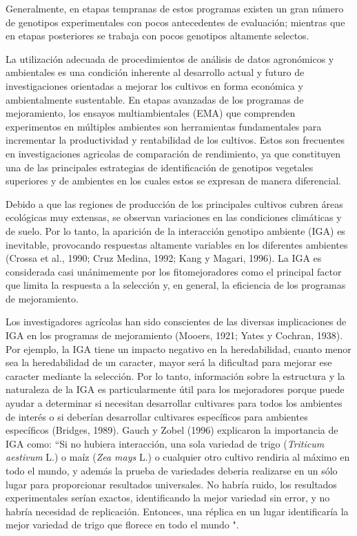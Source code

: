 Generalmente, en etapas tempranas de estos programas existen un gran número de genotipos experimentales con pocos antecedentes de evaluación; mientras que en etapas posteriores  se trabaja con pocos genotipos altamente selectos. 

La utilización adecuada de procedimientos de análisis de datos agronómicos y ambientales es una condición inherente al desarrollo actual y futuro de investigaciones orientadas a mejorar los cultivos en forma económica y ambientalmente sustentable. En etapas avanzadas de los programas de mejoramiento, los ensayos multiambientales (EMA) que comprenden experimentos en múltiples ambientes son herramientas fundamentales para incrementar la productividad y rentabilidad de los cultivos. Estos son frecuentes en investigaciones agricolas de comparación de rendimiento, ya que constituyen una de las principales estrategias de identificación de genotipos vegetales superiores y de ambientes en los cuales estos se expresan de manera diferencial.

Debido a que las regiones de producción de los principales cultivos cubren áreas ecológicas muy extensas, se observan variaciones en las condiciones climáticas y de suelo. Por lo tanto, la aparición de la interacción genotipo ambiente (IGA) es inevitable, provocando respuestas altamente variables en los diferentes ambientes (Crossa et al., 1990; Cruz Medina, 1992; Kang y Magari, 1996). La IGA es considerada casi unánimemente por los fitomejoradores como el principal factor que limita la respuesta a la selección y, en general, la eficiencia de los programas de mejoramiento. 

Los investigadores agrícolas han sido conscientes de las diversas implicaciones de IGA en los programas de mejoramiento (Mooers, 1921; Yates y Cochran, 1938). Por ejemplo, la IGA tiene un impacto negativo en la heredabilidad, cuanto menor sea la heredabilidad de un caracter, mayor será la dificultad para mejorar ese caracter mediante la selección.
Por lo tanto, información sobre la estructura y la naturaleza de la IGA es particularmente útil para los mejoradores porque puede ayudar a determinar si necesitan desarrollar cultivares para todos los ambientes de interés o si deberían desarrollar cultivares específicos para ambientes específicos (Bridges, 1989). Gauch y Zobel (1996) explicaron la importancia de IGA como: “Si no hubiera interacción, una sola variedad de trigo (\emph{Triticum aestivum} L.) o maíz (\emph{Zea mays} L.) o cualquier otro cultivo rendiria al máximo en todo el mundo, y además la prueba de variedades deberia realizarse en un sólo lugar para proporcionar resultados universales. No habría ruido, los resultados experimentales serían exactos, identificando la mejor variedad sin error, y no habría necesidad de replicación. Entonces, una réplica en un lugar identificaría la mejor variedad de trigo que florece en todo el mundo ".


